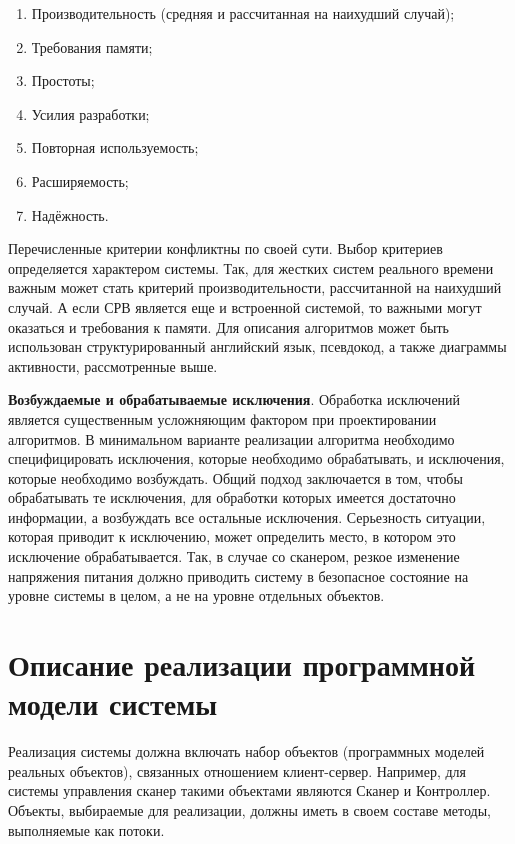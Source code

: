 \documentclass[12pt]{article}
\let\oldsection\section
\renewcommand{\section}[1]{
    \oldsection{#1}
    \setcounter{table}{0}
    \setcounter{figure}{0}
}
\begin{document}
    \begin{enumerate}
        \item Производительность (средняя и рассчитанная на наихудший случай);
        \item Требования памяти;
        \item Простоты;
        \item Усилия разработки;
        \item Повторная используемость;
        \item Расширяемость;
        \item Надёжность.
    \end{enumerate}

    Перечисленные критерии конфликтны по своей сути. Выбор критериев определяется характером системы. Так, для жестких систем реального времени важным может стать критерий производительности, рассчитанной на наихудший случай. А если СРВ является еще и встроенной системой, то важными могут оказаться и требования к памяти. Для описания алгоритмов может быть использован структурированный английский язык, псевдокод, а также диаграммы активности, рассмотренные выше.

    \textbf{Возбуждаемые и обрабатываемые исключения}. Обработка исключений является существенным усложняющим фактором при проектировании алгоритмов. В минимальном варианте реализации алгоритма необходимо специфицировать исключения, которые необходимо обрабатывать, и исключения, которые необходимо возбуждать. Общий подход заключается в том, чтобы обрабатывать те исключения, для обработки которых имеется достаточно информации, а возбуждать все остальные исключения. Серьезность ситуации, которая приводит к исключению, может определить место, в котором это исключение обрабатывается. Так, в случае со сканером, резкое изменение напряжения питания должно приводить систему в безопасное состояние на уровне системы в целом, а не на уровне отдельных объектов.

    \newpage

    \section{Описание реализации программной модели системы}

    Реализация системы должна включать набор объектов (программных моделей реальных объектов), связанных отношением клиент-сервер. Например, для системы управления сканер такими объектами являются Сканер и Контроллер. Объекты, выбираемые для реализации, должны иметь в своем составе методы, выполняемые как потоки.
\end{document}
